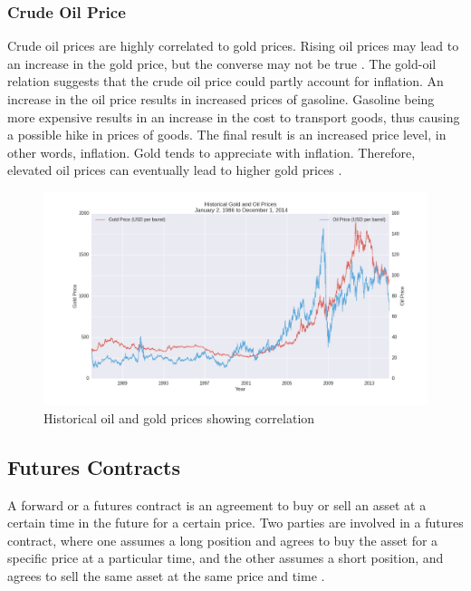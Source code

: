 \documentclass[runningheads]{llncs}
\begin{document}
\subsubsection{Crude Oil Price}
Crude oil prices are highly correlated to gold prices. Rising oil prices may lead to an increase in the gold price, but the converse may not be true \cite{gold-shafiee}\cite{gold-zhang}.
The gold-oil relation suggests that the crude oil price could partly account for inflation. An increase in the oil price results in increased prices of gasoline. Gasoline being more expensive results in an increase in the cost to transport goods, thus causing a possible hike in prices of goods. The final result is an increased price level, in other words, inflation. Gold tends to appreciate with inflation. Therefore, elevated oil prices can eventually lead to higher gold prices \cite{gold-url1}. 

\begin{figure}
\centering
\includegraphics[width=\textwidth]{OilvsGold.png}
\caption{Historical oil and gold prices showing correlation}
\label{fig:OilvsGold.png}
\end{figure}

\newpage

\subsection {Futures Contracts}

\noindent A forward or a futures contract is an agreement to buy or sell an asset at a certain time in the future for a certain price.  Two parties are involved in a futures contract, where one assumes a long position and agrees to buy the asset for a specific price at a particular time, and the other assumes a short position, and agrees to sell the same asset at the same price and time \cite{futuresbook}. \\
\end{document}
